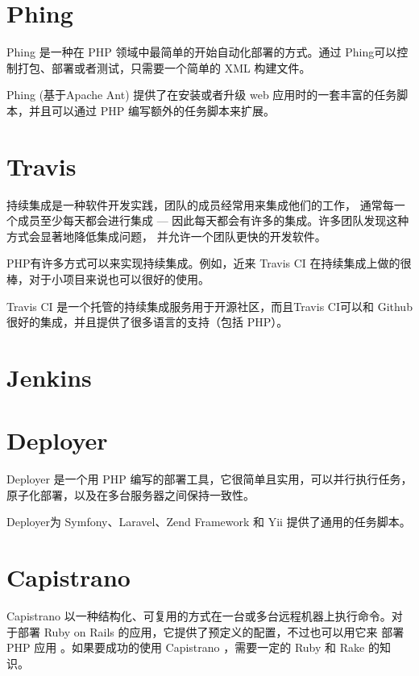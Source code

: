 \section{Phing}


Phing 是一种在 PHP 领域中最简单的开始自动化部署的方式。通过 Phing可以控制打包、部署或者测试，只需要一个简单的 XML 构建文件。

Phing (基于Apache Ant) 提供了在安装或者升级 web 应用时的一套丰富的任务脚本，并且可以通过 PHP 编写额外的任务脚本来扩展。

\section{Travis}


持续集成是一种软件开发实践，团队的成员经常用来集成他们的工作， 通常每一个成员至少每天都会进行集成 — 因此每天都会有许多的集成。许多团队发现这种方式会显著地降低集成问题， 并允许一个团队更快的开发软件。

PHP有许多方式可以来实现持续集成。例如，近来 Travis CI 在持续集成上做的很棒，对于小项目来说也可以很好的使用。

Travis CI 是一个托管的持续集成服务用于开源社区，而且Travis CI可以和 Github 很好的集成，并且提供了很多语言的支持（包括 PHP）。

\section{Jenkins}



\section{Deployer}


Deployer 是一个用 PHP 编写的部署工具，它很简单且实用，可以并行执行任务，原子化部署，以及在多台服务器之间保持一致性。

Deployer为 Symfony、Laravel、Zend Framework 和 Yii 提供了通用的任务脚本。





\section{Capistrano}

Capistrano 以一种结构化、可复用的方式在一台或多台远程机器上执行命令。对于部署 Ruby on Rails 的应用，它提供了预定义的配置，不过也可以用它来 部署 PHP 应用 。如果要成功的使用 Capistrano ，需要一定的 Ruby 和 Rake 的知识。




